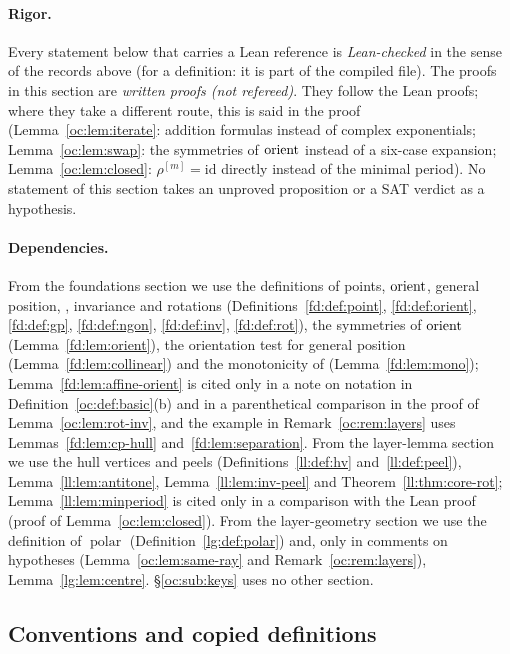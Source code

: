 \paragraph{Rigor.} Every statement below that carries a Lean reference is \emph{Lean-checked} in the
sense of the records above (for a definition: it is part of the compiled file). The proofs in this
section are \emph{written proofs (not refereed)}. They
follow the Lean proofs; where they take a different route, this is said in the proof
(Lemma~\ref{oc:lem:iterate}: addition formulas instead of complex exponentials;
Lemma~\ref{oc:lem:swap}: the symmetries of $\operatorname{orient}$ instead of a six-case expansion;
Lemma~\ref{oc:lem:closed}: $\rho^{[m]}=\mathrm{id}$ directly instead of the minimal period). No
statement of this section takes an unproved proposition or a SAT verdict as a hypothesis.

\paragraph{Dependencies.} From the foundations section we use the definitions of points, $\operatorname{orient}$,
general position, , invariance and rotations (Definitions~\ref{fd:def:point},
\ref{fd:def:orient}, \ref{fd:def:gp}, \ref{fd:def:ngon}, \ref{fd:def:inv}, \ref{fd:def:rot}), the
symmetries of $\operatorname{orient}$ (Lemma~\ref{fd:lem:orient}), the orientation test for general position
(Lemma~\ref{fd:lem:collinear}) and the monotonicity of  (Lemma~\ref{fd:lem:mono});
Lemma~\ref{fd:lem:affine-orient} is cited only in a note on notation in
Definition~\ref{oc:def:basic}(b) and in a parenthetical comparison in the proof of
Lemma~\ref{oc:lem:rot-inv}, and the example in Remark~\ref{oc:rem:layers} uses
Lemmas~\ref{fd:lem:cp-hull} and~\ref{fd:lem:separation}. From the layer-lemma section we use the hull
vertices and peels (Definitions~\ref{ll:def:hv} and~\ref{ll:def:peel}), Lemma~\ref{ll:lem:antitone},
Lemma~\ref{ll:lem:inv-peel} and Theorem~\ref{ll:thm:core-rot}; Lemma~\ref{ll:lem:minperiod} is cited
only in a comparison with the Lean proof (proof of Lemma~\ref{oc:lem:closed}). From the layer-geometry
section we use the definition of $\operatorname{polar}$ (Definition~\ref{lg:def:polar}) and, only in
comments on hypotheses (Lemma~\ref{oc:lem:same-ray} and Remark~\ref{oc:rem:layers}),
Lemma~\ref{lg:lem:centre}. \S\ref{oc:sub:keys} uses no other section.

\subsection{Conventions and copied definitions}\label{oc:sub:conv}

